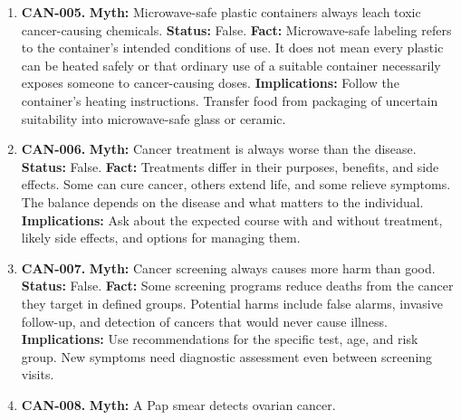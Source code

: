 \documentclass[11pt,oneside]{book}
\begin{document}
\begin{enumerate}[leftmargin=0pt,labelwidth=0pt,labelsep=0pt,itemindent=0pt]
\textbf{Status:} False.\newline
\textbf{Fact:} Most cancers arise in people who have not inherited a high-risk cancer variant. Risk also reflects age, exposures, and genetic changes acquired over a lifetime. \cite{ref16}\newline
\textbf{Implications:} Follow applicable screening guidance even without a family history. A strong family history may change which screening is appropriate.
\item[] \textbf{CAN-005.} \textbf{Myth:} Microwave-safe plastic containers always leach toxic cancer-causing chemicals.\newline
\textbf{Status:} False.\newline
\textbf{Fact:} Microwave-safe labeling refers to the container's intended conditions of use. It does not mean every plastic can be heated safely or that ordinary use of a suitable container necessarily exposes someone to cancer-causing doses. \cite{ref6}\newline
\textbf{Implications:} Follow the container's heating instructions. Transfer food from packaging of uncertain suitability into microwave-safe glass or ceramic.
\item[] \textbf{CAN-006.} \textbf{Myth:} Cancer treatment is always worse than the disease.\newline
\textbf{Status:} False.\newline
\textbf{Fact:} Treatments differ in their purposes, benefits, and side effects. Some can cure cancer, others extend life, and some relieve symptoms. The balance depends on the disease and what matters to the individual. \cite{ref16}\newline
\textbf{Implications:} Ask about the expected course with and without treatment, likely side effects, and options for managing them.
\item[] \textbf{CAN-007.} \textbf{Myth:} Cancer screening always causes more harm than good.\newline
\textbf{Status:} False.\newline
\textbf{Fact:} Some screening programs reduce deaths from the cancer they target in defined groups. Potential harms include false alarms, invasive follow-up, and detection of cancers that would never cause illness. \cite{ref185}\newline
\textbf{Implications:} Use recommendations for the specific test, age, and risk group. New symptoms need diagnostic assessment even between screening visits.
\item[] \textbf{CAN-008.} \textbf{Myth:} A Pap smear detects ovarian cancer.\newline

\end{enumerate}
\end{document}
